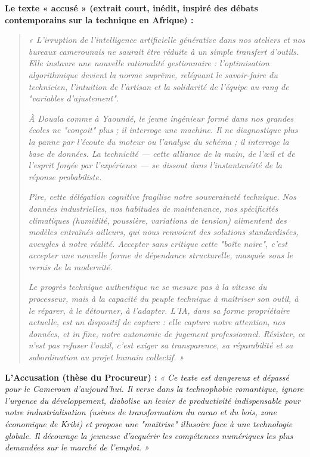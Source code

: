 \documentclass[11pt]{article}
\begin{document}
\textbf{Le texte « accusé » (extrait court, inédit, inspiré des débats contemporains sur la technique en Afrique) :}
\begin{quote}
\emph{« L'irruption de l'intelligence artificielle générative dans nos ateliers et nos bureaux camerounais ne saurait être réduite à un simple transfert d'outils. Elle instaure une nouvelle rationalité gestionnaire : l'optimisation algorithmique devient la norme suprême, reléguant le savoir-faire du technicien, l'intuition de l'artisan et la solidarité de l'équipe au rang de "variables d'ajustement".}

\emph{À Douala comme à Yaoundé, le jeune ingénieur formé dans nos grandes écoles ne "conçoit" plus ; il interroge une machine. Il ne diagnostique plus la panne par l'écoute du moteur ou l'analyse du schéma ; il interroge la base de données. La technicité --- cette alliance de la main, de l'\oe il et de l'esprit forgée par l'expérience --- se dissout dans l'instantanéité de la réponse probabiliste.}

\emph{Pire, cette délégation cognitive fragilise notre souveraineté technique. Nos données industrielles, nos habitudes de maintenance, nos spécificités climatiques (humidité, poussière, variations de tension) alimentent des modèles entraînés ailleurs, qui nous renvoient des solutions standardisées, aveugles à notre réalité. Accepter sans critique cette "boîte noire", c'est accepter une nouvelle forme de dépendance structurelle, masquée sous le vernis de la modernité.}

\emph{Le progrès technique authentique ne se mesure pas à la vitesse du processeur, mais à la capacité du peuple technique à maîtriser son outil, à le réparer, à le détourner, à l'adapter. L'IA, dans sa forme propriétaire actuelle, est un dispositif de capture : elle capture notre attention, nos données, et in fine, notre autonomie de jugement professionnel. Résister, ce n'est pas refuser l'outil, c'est exiger sa transparence, sa réparabilité et sa subordination au projet humain collectif. »}
\end{quote}

\textbf{L'Accusation (thèse du Procureur) :} \emph{« Ce texte est dangereux et dépassé pour le Cameroun d'aujourd'hui. Il verse dans la technophobie romantique, ignore l'urgence du développement, diabolise un levier de productivité indispensable pour notre industrialisation (usines de transformation du cacao et du bois, zone économique de Kribi) et propose une "maîtrise" illusoire face à une technologie globale. Il décourage la jeunesse d'acquérir les compétences numériques les plus demandées sur le marché de l'emploi. »}
\end{document}
